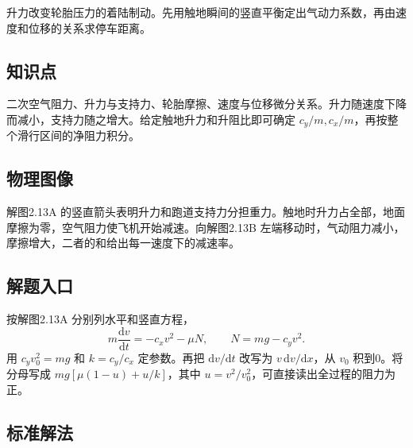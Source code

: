 \documentclass[UTF8,fontset=fandol,a4paper,11pt]{ctexart}
\begin{document}
升力改变轮胎压力的着陆制动。先用触地瞬间的竖直平衡定出气动力系数，再由速度和位移的关系求停车距离。



\subsection*{知识点}

二次空气阻力、升力与支持力、轮胎摩擦、速度与位移微分关系。升力随速度下降而减小，支持力随之增大。给定触地升力和升阻比即可确定 $c_y/m,c_x/m$，再按整个滑行区间的净阻力积分。




\subsection*{物理图像}

解图2.13A 的竖直箭头表明升力和跑道支持力分担重力。触地时升力占全部，地面摩擦为零，空气阻力使飞机开始减速。向解图2.13B 左端移动时，气动阻力减小，摩擦增大，二者的和给出每一速度下的减速率。



\subsection*{解题入口}

按解图2.13A 分别列水平和竖直方程，
\[
m\frac{\mathrm dv}{\mathrm dt}=-c_xv^2-\mu N,\qquad N=mg-c_yv^2.
\]
用 $c_yv_0^2=mg$ 和 $k=c_y/c_x$ 定参数。再把 $\mathrm dv/\mathrm dt$ 改写为 $v\,\mathrm dv/\mathrm dx$，从 $v_0$ 积到0。将分母写成 $mg[\mu(1-u)+u/k]$，其中 $u=v^2/v_0^2$，可直接读出全过程的阻力为正。



\subsection*{标准解法}
\end{document}
